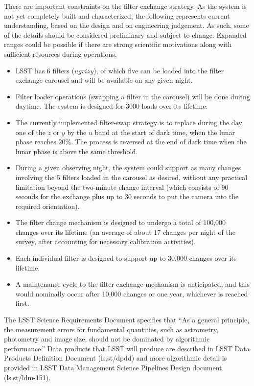 \documentclass[DM,lsstdraft,toc,usenatbib]{lsstdoc}
\begin{document}
There are important constraints on the filter exchange strategy. As the system is not yet completely 
built and characterized, the following represents current understanding, based on the design and on 
engineering judgement. As such, some of the details should be considered preliminary and subject 
to change. Expanded ranges could be possible if there are strong scientific motivations along with
sufficient resources during operations.
\begin{itemize}
\item LSST has 6 filters ($ugrizy$), of which five can be loaded into the filter exchange carousel and
will be available on any given night. 
\item Filter loader operations (swapping a filter in the carousel) will be done during daytime. The system 
          is designed for 3000 loads over its lifetime. 
\item The currently implemented filter-swap strategy is to replace during the day one of the $z$ or $y$ 
	by the $u$ band at the start of dark time, when the lunar phase reaches $20\%$. The 
	process is reversed at the end of dark time when the lunar phase is above the same threshold.
\item During a given observing night, the system could support as many changes involving the 5 filters 
          loaded in the carousel as desired, without any practical limitation beyond the two-minute change 
          interval (which consists of 90 seconds for the exchange plus up to 30 seconds to put the camera
          into the required orientation). 
\item The filter change mechanism is designed to undergo a total of 100,000 changes over its lifetime 
	(an average of about 17 changes per night of the survey, after accounting for necessary calibration activities). 
\item Each individual filter is designed to support up to 30,000 changes over its lifetime.
\item A maintenance cycle to the filter exchange mechanism is anticipated, and this would nominally occur after 10,000 changes or 
          one year, whichever is reached first. 
\end{itemize} 



The LSST Science Requirements Document specifies that ``As a general principle, the measurement errors
for fundamental quantities, such as astrometry, photometry and image size, should not be dominated by 
algorithmic performance.'' Data products that LSST will produce are described in LSST Data Products
Definition Document (ls.st/dpdd) and more algorithmic detail is provided in LSST Data Management 
Science Pipelines Design document (ls.st/ldm-151). 
\end{document}
